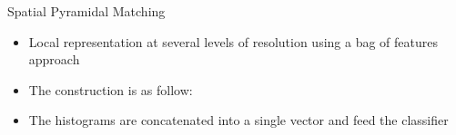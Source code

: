 \documentclass[usenames,dvipsnames]{beamer}
\begin{document}
\begin{frame}{Spatial Pyramidal Matching}
\begin{itemize}
\item<1-> Local representation at several levels of resolution using a bag of features approach

\item<2-> The construction is as follow:
\item<6> The histograms are concatenated into a single vector and feed the classifier
\end{itemize}

\centering{}
\centering{}
\centering{}
\centering{}

\end{frame}
\end{document}
